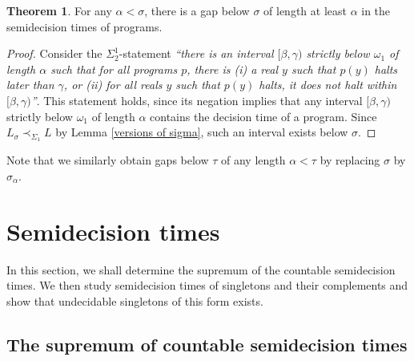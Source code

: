 \documentclass[a4paper,11pt]{amsart}
\theoremstyle{definition}
\newtheorem{theorem}[fact]{Theorem}
\newtheorem*{problem A}{Problem 1}
\newtheorem*{problem B}{Problem 2}
\theoremstyle{remark}
\begin{document}
\begin{theorem} 
\label{uniform running time bound} 
For any $\alpha<\sigma$, there is a gap below $\sigma$ of length at least $\alpha$ in the semidecision times of programs. 
\end{theorem} 
\begin{proof} 
Consider the $\Sigma^1_2$-statement \emph{``there is an interval $[\beta,\gamma)$ strictly below $\omega_1$ of length $\alpha$ such that for all programs $p$, there is (i) a real $y$ such that $p(y)$ halts later than $\gamma$, or (ii) for all reals $y$ such that $p(y)$ halts, it does not halt within $[\beta,\gamma)$''}. 
This statement holds, since its negation implies that any interval $[\beta,\gamma)$ strictly below $\omega_1$ of length $\alpha$ contains the decision time of a program. 
Since $L_\sigma\prec_{\Sigma_1}L$ by Lemma \ref{versions of sigma}, such an interval exists below $\sigma$. 
\end{proof}

Note that we similarly obtain gaps below $\tau$ of any length $\alpha<\tau$ by replacing $\sigma$ by $\sigma_\alpha$. 






\section{Semidecision times}


In this section, we shall determine the supremum of the countable semidecision times. 
We then study semidecision times of singletons and their complements and show that undecidable singletons of this form exists. 


\subsection{The supremum of countable semidecision times}
\end{document}
